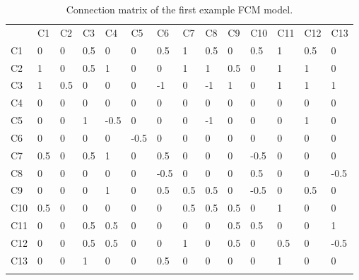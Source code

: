 \documentclass[graybox]{svmult}
\begin{document}
\begin{table}
\caption{Connection matrix of the first example FCM model.}
\label{tab:OMconnectionMtx}
\begin{center}
\begin{tabular}{l|lllllllllllll}
\hline\noalign{\smallskip}
 & C1 & C2 & C3 & C4 & C5 & C6 & C7 & C8 & C9 & C10 & C11 & C12 & C13\\
\noalign{\smallskip}\hline\noalign{\smallskip}
C1 &    0 &     0 &     0.5 &   0 &     0 &     0.5 &   1 &     0.5 &   0 &     0.5 &   1 &     0.5 &   0\\
C2 &    1 &     0 &     0.5 &   1 &     0 &     0 &     1 &     1 &     0.5 &   0 &     1 &     1 &     0\\
C3 &    1 &     0.5 &   0 &     0 &     0 &     -1 &    0 &     -1 &    1 &     0 &     1 &     1 &     1\\
C4 &    0 &     0 &     0 &     0 &     0 &     0 &     0 &     0 &     0 &     0 &     0 &     0 &     0\\
C5 &    0 &     0 &     1 &     -0.5 &  0 &     0 &     0 &     -1 &    0 &     0 &     0 &     1 &     0\\
C6 &    0 &     0 &     0 &     0 &     -0.5 &  0 &     0 &     0 &     0 &     0 &     0 &     0 &     0\\
C7 &    0.5 &   0 &     0.5 &   1 &     0 &     0.5 &   0 &     0 &     0 &     -0.5 &  0 &     0 &     0\\
C8 &    0 &     0 &     0 &     0 &     0 &     -0.5 &  0 &     0 &     0 &     0.5 &   0 &     0 &     -0.5\\
C9 &    0 &     0 &     0 &     1 &     0 &     0.5 &   0.5 &   0.5 &   0 &     -0.5 &  0 &     0.5 &   0\\
C10 &   0.5 &   0 &     0 &     0 &     0 &     0 &     0.5 &   0.5 &   0.5 &   0 &     1 &     0 &     0\\
C11 &   0 &     0 &     0.5 &   0.5 &   0 &     0 &     0 &     0 &     0.5 &   0.5 &   0 &     0 &     1\\
C12 &   0 &     0 &     0.5 &   0.5 &   0 &     0 &     1 &     0 &     0.5 &   0 &     0.5 &   0 &     -0.5\\
C13 &   0 &     0 &     1 &     0 &     0 &     0.5 &   0 &     0 &     0 &     0 &     1 &     0 &     0\\
\noalign{\smallskip}\hline
\end{tabular}
\end{center}
\end{table}
\end{document}
